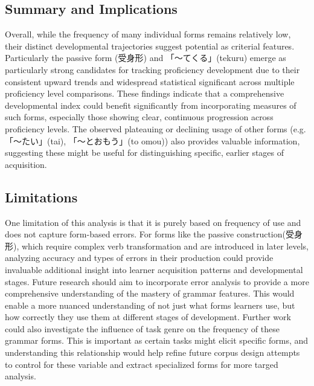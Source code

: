 \subsection{Summary and Implications}
Overall, while the frequency of many individual forms remains relatively low, their distinct developmental trajectories
suggest potential as
criterial features. Particularly the passive form (受身形) and 「〜てくる」(tekuru) emerge as particularly strong candidates
for tracking proficiency development due to their consistent upward trends and widespread statistical significant
across multiple proficiency level comparisons. These findings indicate that a comprehensive developmental index
could benefit significantly from incorporating measures of such forms, especially those showing clear, continuous
progression across proficiency levels. The observed plateauing or declining usage of other forms (e.g. 「〜たい」(tai),
「〜とおもう」(to omou)) also provides valuable information, suggesting these might be useful for distinguishing specific,
earlier stages of acquisition.

\subsection{Limitations}
One limitation of
this analysis is that it is purely based on frequency of use and does not capture form-based errors. For forms like the
passive construction(受身形), which require complex verb transformation and are introduced in later levels, analyzing
accuracy and types of errors in their production could provide invaluable additional insight into learner
acquisition patterns and developmental stages. Future research should aim to incorporate error analysis to provide a
more comprehensive understanding of the mastery of grammar features. This would enable a more nuanced understanding
of not just what forms learners use, but how correctly they use them at different stages of development. Further
work could also investigate the influence of task genre on the frequency of these grammar forms. This is important
as certain tasks might elicit specific forms, and understanding this relationship would help refine future corpus
design attempts to control for these variable and extract specialized forms for more targed analysis.